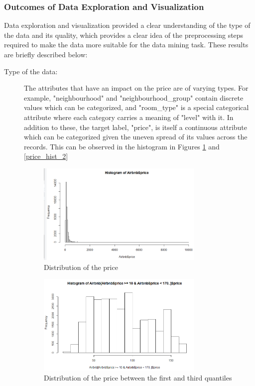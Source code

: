 \documentclass{sig-alternate}
\begin{document}
       \subsubsection{Outcomes of Data Exploration and Visualization}
       Data exploration and visualization provided a clear understanding of the type of the data and its quality, which provides a clear idea of the preprocessing steps required to make the data more suitable for the data mining task. These results are briefly described below:
       \begin{description}
           \item[Type of the data:] The attributes that have an impact on the price are of varying types. For example, "neighbourhood" and "neighbourhood\_group" contain discrete values which can be categorized, and "room\_type" is a special categorical attribute where each category carries a meaning of "level" with it. In addition to these, the target label, "price", is itself a continuous attribute which can be categorized given the uneven spread of its values across the records. This can be observed in the histogram in Figures \ref{price_hist_1} and \ref{price_hist_2}
	\begin{figure}[ht]
		\includegraphics[width=8cm]{price_hist_1.png}
		\centering
		\caption{Distribution of the price}
		\label{price_hist_1}
	\end{figure}
	\begin{figure}[ht]
		\includegraphics[width=8cm]{price_hist_2.png}
		\centering
		\caption{Distribution of the price between the first and third quantiles}

\end{figure}
\end{description}
\end{document}
